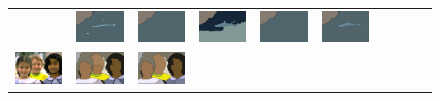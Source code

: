 \begin{figure}[tb]
\begin{center}
\begin{tabular}{cccccccccc}
&\includegraphics[width=2cm]{scale-aware/fig/visual_result/visual_result_4_3.png} \hspace{-4mm}
&\includegraphics[width=2cm]{scale-aware/fig/visual_result/visual_result_4_4.png}\hspace{-4mm}
&\includegraphics[width=2cm]{scale-aware/fig/visual_result/visual_result_4_5.png}\hspace{-4mm}
&\includegraphics[width=2cm]{scale-aware/fig/visual_result/visual_result_4_6.png}\hspace{-4mm}
&\includegraphics[width=2cm]{scale-aware/fig/visual_result/visual_result_4_7.png}\hspace{-4mm}
\\
\hspace{-2mm}
\includegraphics[width=2cm]{scale-aware/fig/visual_result/visual_result_5_1.png}\hspace{-4mm}
&\includegraphics[width=2cm]{scale-aware/fig/visual_result/visual_result_5_2.png}\hspace{-4mm}
&\includegraphics[width=2cm]{scale-aware/fig/visual_result/visual_result_5_3.png}\hspace{-4mm}

\end{tabular}
\end{center}
\end{figure}
